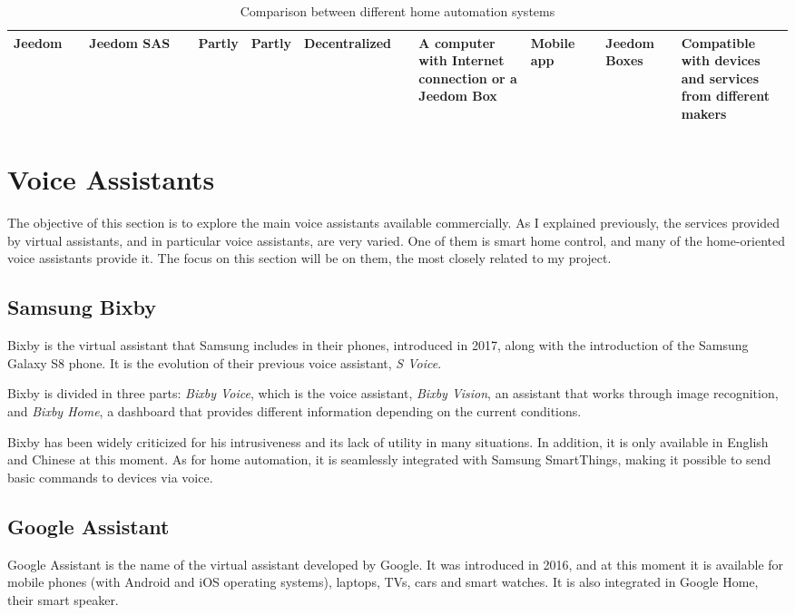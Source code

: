 \begin{table}
\begin{center}
{\begin{tabular}{|p{0.1\linewidth}|p{0.15\linewidth}|p{0.05\linewidth}|p{0.05\linewidth}|p{0.15\linewidth}|p{0.15\linewidth}|p{0.1\linewidth}|p{0.1\linewidth}|p{0.39\linewidth}|}
			Jeedom               & Jeedom SAS                                            & Partly             & Partly           & Decentralized         & A computer with Internet connection or a Jeedom Box & Mobile app                                                     & Jeedom Boxes                          & Compatible with devices and services from different makers                                                      \\ \hline
		\end{tabular}}
		\caption{Comparison between different home automation systems}
		\label{table:home-automation-comparison}
	\end{center}
\end{table}

\section{Voice Assistants}
The objective of this section is to explore the main voice assistants available commercially. As I explained previously, the services
provided by virtual assistants, and in particular voice assistants, are very varied. One of them is smart home control, and many of
the home-oriented voice assistants provide it. The focus on this section will be on them, the most closely related to my project.

\subsection{Samsung Bixby}
Bixby is the virtual assistant that Samsung includes in their phones, introduced in 2017, along with the introduction of the Samsung 
Galaxy S8 phone. It is the evolution of their previous voice assistant, \textit{S Voice}.

Bixby is divided in three parts: \textit{Bixby Voice}, which is the voice assistant, \textit{Bixby Vision}, an assistant that works through
image recognition, and \textit{Bixby Home}, a dashboard that provides different information depending on the current 
conditions.\cite{samsungBixby}

Bixby has been widely criticized for his intrusiveness and its lack of utility in many situations. In addition, it is only available in English
and Chinese at this moment. As for home automation, it is seamlessly integrated with Samsung SmartThings, making it possible to send
basic commands to devices via voice.

\subsection{Google Assistant}
Google Assistant is the name of the virtual assistant developed by Google. It was introduced in 2016, and at this moment it is
available for mobile phones (with Android and iOS operating systems), laptops, TVs, cars and smart watches. It is also integrated in 
Google Home, their smart speaker.\cite{googleAssistant}

